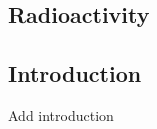 \documentclass[jmp, amsmath, amssymb, reprint]{article}
\numberwithin{equation}{section}
\newcommand{\lp}{\left(}
\newcommand{\rp}{\right)}
\begin{document}
\begin{multicols}{2}
\clearpage

\section{Radioactivity}

\subsection*{Introduction}

Add introduction



\end{multicols}






%
% 
\end{document}
